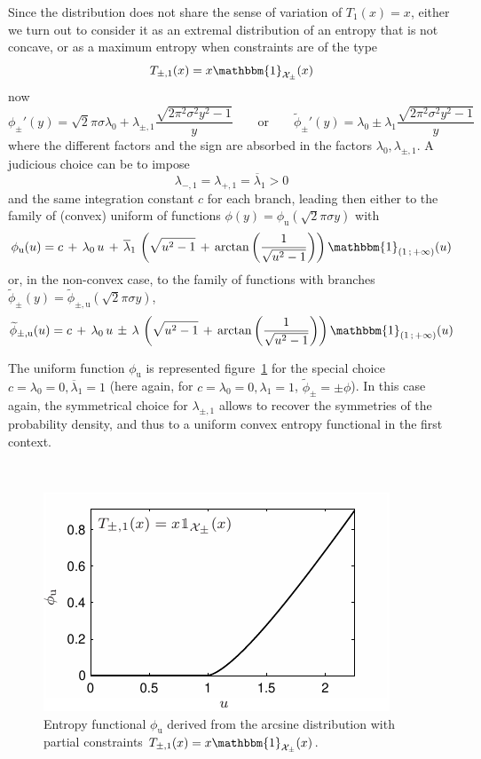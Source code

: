 \documentclass[english,sort&compress]{elsarticle}
\theoremstyle{definition}
\theoremstyle{plain}
\theoremstyle{plain}
\def\X{\mathcal{X}}
\def\un{\mathbbm{1}}
\begin{document}
Since the  distribution does not share the  sense of variation of  $T_1(x) = x$,
either we turn out to consider it as an extremal distribution of an entropy that
is not concave, or as a maximum entropy when constraints are of the type
%
\[
T_{\pm,1}(x) = x \un_{\X_\pm}(x)
\]
%
now 
%
\[
\phi_\pm'(y) = \sqrt2 \pi \sigma \lambda_0 + \lambda_{\pm,1} \frac{\sqrt{2 \pi^2
    \sigma^2  y^2 -  1}}{y} \qquad  \mbox{or} \qquad  \widetilde{\phi}_\pm'(y) =
\lambda_0 \pm \lambda_1 \frac{\sqrt{2 \pi^2 \sigma^2 y^2 - 1}}{y}
\]
%
where  the  different  factors  and  the  sign  are  absorbed  in  the  factors
$\lambda_0, \lambda_{\pm,1}$. A judicious choice can be to impose
%
\[
\lambda_{-,1} = \lambda_{+,1} = \overline{\lambda}_1 > 0
\]
%
and the  same integration constant $c$  for each branch, leading  then either to
the family of (convex)  uniform of functions $\phi(y) = \phi_{\mathrm{u}}(\sqrt2
\pi \sigma y)$ with
%
\[
\phi_{\mathrm{u}}(u) = c \, + \,  \lambda_0 \, u \, + \, \overline{\lambda}_1 \,
\left( \sqrt{u^2  - 1}  \, + \,  \arctan\left( \frac{1}{\sqrt{u^2 -  1}} \right)
\right) \un_{\left( 1 \, ; \, +\infty \right)}(u)
\]
%
or,  in  the  non-convex  case,   to  the  family  of  functions  with  branches
$\widetilde{\phi}_{\pm}(y) = \widetilde{\phi}_{\pm,\mathrm{u}}(\sqrt2 \pi \sigma
y)$,
%
\[
\widetilde{\phi}_{\pm,\mathrm{u}}(u) = c \, + \, \lambda_0 \, u \, \pm \, \lambda \, \left(
  \sqrt{u^2 - 1} \, +  \, \arctan\left( \frac{1}{\sqrt{u^2 - 1}} \right) \right)
\un_{\left( 1 \, ; \, +\infty \right)}(u)
\]


The      uniform      function      $\phi_{\mathrm{u}}$      is      represented
figure~\ref{fig:Entropy-arcsin}  for the  special  choice $c  =  \lambda_0 =  0,
\overline{\lambda}_1 = 1$  (here again, for $c = \lambda_0 =  0, \lambda_1 = 1$,
$\widetilde{\phi}_\pm = \pm \phi$).  In  this case again, the symmetrical choice
for  $\lambda_{\pm,1}$  allows to  recover  the  symmetries  of the  probability
density, and thus to a uniform convex entropy functional in the first context.

\
 
\begin{figure}[htbp]
\centerline{\includegraphics[width=.43\textwidth]{PDF/MaxEnt_ArcsineLaw}}
\caption{Entropy  functional   $\phi_{\mathrm{u}}$  derived  from   the  arcsine
  distribution with partial constraints $T_{\pm,1}(x) = x \un_{\X_\pm}(x)$.}
\label{fig:Entropy-arcsin}
\end{figure}
\end{document}
